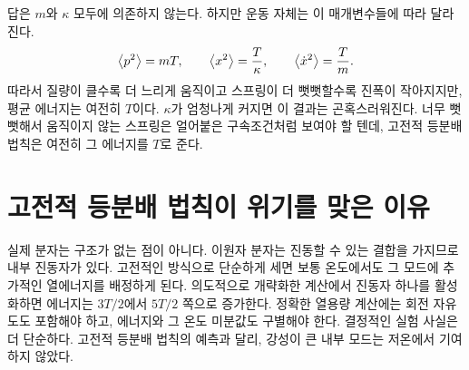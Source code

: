 답은 \(m\)와 \(\kappa\) 모두에 의존하지 않는다. 하지만 운동 자체는 이 매개변수들에 따라 달라진다.
\begin{equation}
 \left\langle p^2\right\rangle=mT,
 \qquad
 \left\langle x^2\right\rangle=\frac{T}{\kappa},
 \qquad
 \left\langle\dot{x}^2\right\rangle=\frac{T}{m}.
 \label{eq:sm7-classical-fluctuations}
\end{equation}
따라서 질량이 클수록 더 느리게 움직이고 스프링이 더 뻣뻣할수록 진폭이 작아지지만, 평균 에너지는 여전히 \(T\)이다. \(\kappa\)가 엄청나게 커지면 이 결과는 곤혹스러워진다. 너무 뻣뻣해서 움직이지 않는 스프링은 얼어붙은 구속조건처럼 보여야 할 텐데, 고전적 등분배 법칙은 여전히 그 에너지를 \(T\)로 준다.

\begin{classroomqa}
\end{classroomqa}

\begin{classroomqa}
\end{classroomqa}

\section{고전적 등분배 법칙이 위기를 맞은 이유}

실제 분자는 구조가 없는 점이 아니다. 이원자 분자는 진동할 수 있는 결합을 가지므로 내부 진동자가 있다. 고전적인 방식으로 단순하게 세면 보통 온도에서도 그 모드에 추가적인 열에너지를 배정하게 된다. 의도적으로 개략화한 계산에서 진동자 하나를 활성화하면 에너지는 \(3T/2\)에서 \(5T/2\) 쪽으로 증가한다. 정확한 열용량 계산에는 회전 자유도도 포함해야 하고, 에너지와 그 온도 미분값도 구별해야 한다. 결정적인 실험 사실은 더 단순하다. 고전적 등분배 법칙의 예측과 달리, 강성이 큰 내부 모드는 저온에서 기여하지 않았다.

